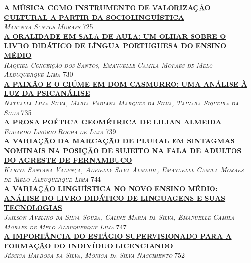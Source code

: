 \noindent \textsc{\hyperlink{trabalhos/241780.pdf.1}{\textbf{A MÚSICA COMO INSTRUMENTO DE VALORIZAÇÃO CULTURAL A PARTIR DA SOCIOLINGUÍSTICA}}}\\ 
\noindent \textsc{\textit{Marynna Santos Moraes}} \hfill 725\\ 

\noindent \textsc{\hyperlink{trabalhos/251786.pdf.1}{\textbf{A ORALIDADE EM SALA DE AULA: UM OLHAR SOBRE O LIVRO DIDÁTICO DE LÍNGUA PORTUGUESA DO ENSINO MÉDIO }}}\\ 
\noindent \textsc{\textit{Raquiel Conceição dos Santos, Emanuelle Camila Moraes de Melo Albuquerque Lima}} \hfill 730\\ 

\noindent \textsc{\hyperlink{trabalhos/249796.pdf.1}{\textbf{A PAIXÃO E O CIÚME EM DOM CASMURRO: UMA ANÁLISE À LUZ DA PSICANÁLISE }}}\\ 
\noindent \textsc{\textit{Nathalia Lima Silva, Maria Fabiana Marques da Silva, Tainara Siqueira da Silva}} \hfill 735\\ 

\noindent \textsc{\hyperlink{trabalhos/251488.pdf.1}{\textbf{A PROSA POÉTICA GEOMÉTRICA DE LILIAN ALMEIDA}}}\\ 
\noindent \textsc{\textit{Eduardo Libório Rocha de Lima}} \hfill 739\\ 

\noindent \textsc{\hyperlink{trabalhos/251869.pdf.1}{\textbf{A VARIAÇÃO DA MARCAÇÃO DE PLURAL EM SINTAGMAS NOMINAIS NA POSIÇÃO DE SUJEITO NA FALA DE ADULTOS DO AGRESTE DE PERNAMBUCO}}}\\ 
\noindent \textsc{\textit{Karine Santana Valença, Adrielly Silva Almeida, Emanuelle Camila Moraes de Melo Albuquerque Lima}} \hfill 744\\ 

\noindent \textsc{\hyperlink{trabalhos/251857.pdf.1}{\textbf{A VARIAÇÃO LINGUÍSTICA NO NOVO ENSINO MÉDIO: ANÁLISE DO LIVRO DIDÁTICO DE LINGUAGENS E SUAS TECNOLOGIAS}}}\\ 
\noindent \textsc{\textit{Jailson Avelino da Silva Souza, Caline Maria da Silva, Emanuelle Camila Moraes de Melo Albuquerque Lima}} \hfill 747\\ 

\noindent \textsc{\hyperlink{trabalhos/249788.pdf.1}{\textbf{A IMPORTÂNCIA DO ESTÁGIO SUPERVISIONADO PARA A FORMAÇÃO DO INDIVÍDUO LICENCIANDO}}}\\ 
\noindent \textsc{\textit{Jéssica Barbosa da Silva, Mônica da Silva Nascimento}} \hfill 752\\ 

